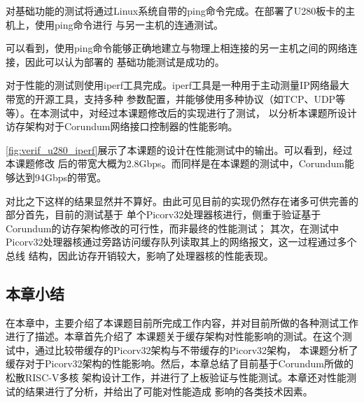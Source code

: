 
对基础功能的测试将通过Linux系统自带的ping命令完成。在部署了U280板卡的主机上，使用ping命令进行
与另一主机的连通测试。


可以看到，使用ping命令能够正确地建立与物理上相连接的另一主机之间的网络连接，因此可以认为部署的
基础功能测试是成功的。


对于性能的测试则使用iperf工具完成。iperf工具是一种用于主动测量IP网络最大带宽的开源工具，支持多种
参数配置，并能够使用多种协议（如TCP、UDP等等）。在本测试中，对经过本课题修改后的实现进行了测试，
以分析本课题所设计访存架构对于Corundum网络接口控制器的性能影响。

\autoref{fig:verif_u280_iperf}展示了本课题的设计在性能测试中的输出。可以看到，经过本课题修改
后的带宽大概为2.8Gbps。而同样是在本课题的测试中，Corundum能够达到94Gbps的带宽。


对比之下这样的结果显然并不算好。由此可见目前的实现仍然存在诸多可供完善的部分首先，目前的测试基于
单个Picorv32处理器核进行，侧重于验证基于Corundum的访存架构修改的可行性，而非最终的性能测试；
其次，在测试中Picorv32处理器核通过旁路访问缓存队列读取其上的网络报文，这一过程通过多个总线
结构，因此访存开销较大，影响了处理器核的性能表现。

\subsection{本章小结}

在本章中，主要介绍了本课题目前所完成工作内容，并对目前所做的各种测试工作进行了描述。本章首先介绍了
本课题关于缓存架构对性能影响的测试。在这个测试中，通过比较带缓存的Picorv32架构与不带缓存的Picorv32架构，
本课题分析了缓存对于Picorv32架构的性能影响。然后，本章总结了目前基于Corundum所做的松散RISC-V多核
架构设计工作，并进行了上板验证与性能测试。本章还对性能测试的结果进行了分析，并给出了可能对性能造成
影响的各类技术因素。
